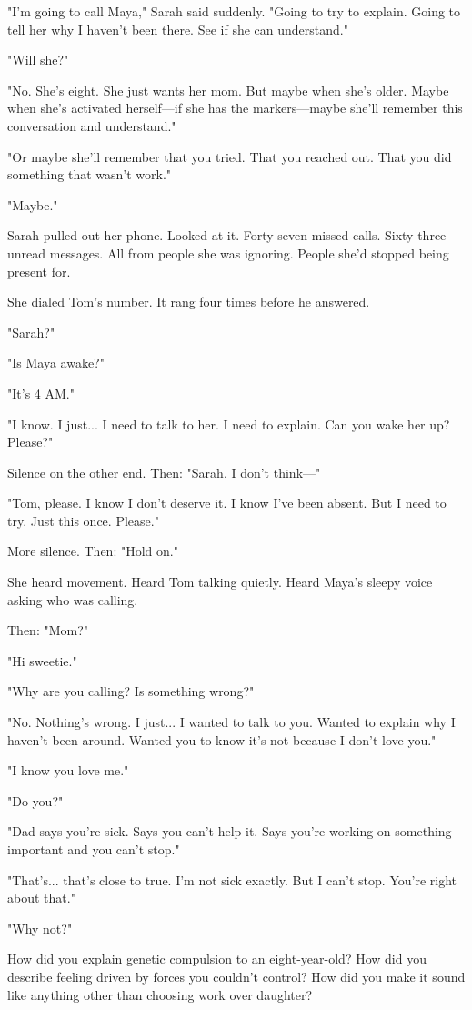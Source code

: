 "I'm going to call Maya," Sarah said suddenly. "Going to try to explain. Going to tell her why I haven't been there. See if she can understand."

"Will she?"

"No. She's eight. She just wants her mom. But maybe when she's older. Maybe when she's activated herself—if she has the markers—maybe she'll remember this conversation and understand."

"Or maybe she'll remember that you tried. That you reached out. That you did something that wasn't work."

"Maybe."

Sarah pulled out her phone. Looked at it. Forty-seven missed calls. Sixty-three unread messages. All from people she was ignoring. People she'd stopped being present for.

She dialed Tom's number. It rang four times before he answered.

"Sarah?"

"Is Maya awake?"

"It's 4 AM."

"I know. I just... I need to talk to her. I need to explain. Can you wake her up? Please?"

Silence on the other end. Then: "Sarah, I don't think—"

"Tom, please. I know I don't deserve it. I know I've been absent. But I need to try. Just this once. Please."

More silence. Then: "Hold on."

She heard movement. Heard Tom talking quietly. Heard Maya's sleepy voice asking who was calling.

Then: "Mom?"

"Hi sweetie."

"Why are you calling? Is something wrong?"

"No. Nothing's wrong. I just... I wanted to talk to you. Wanted to explain why I haven't been around. Wanted you to know it's not because I don't love you."

"I know you love me."

"Do you?"

"Dad says you're sick. Says you can't help it. Says you're working on something important and you can't stop."

"That's... that's close to true. I'm not sick exactly. But I can't stop. You're right about that."

"Why not?"

How did you explain genetic compulsion to an eight-year-old? How did you describe feeling driven by forces you couldn't control? How did you make it sound like anything other than choosing work over daughter?

